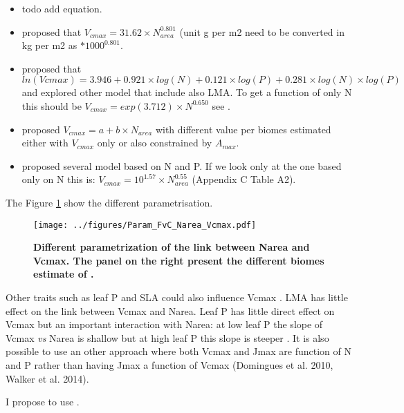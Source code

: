 \documentclass[a4paper,11pt]{article}
\begin{document}
\begin{itemize}

\item \citet{Kattge-2009} todo add equation.

\item \citet{Sakschewski-2015} proposed that $V_{cmax} = 31.62 \times N_{area}^{0.801}$ (unit g per m2 need to be converted in kg per m2 as $*1000^{0.801}$.

\item  \citet{Walker-2014} proposed that $ln(Vcmax) = 3.946 + 0.921 \times log(N) + 0.121 \times log(P) + 0.281 \times log(N) \times log(P)$ and explored other model that include also LMA. To get a function of only N this should be $V_{cmax} = exp(3.712) \times N^{0.650}$ see  \citet{Walker-2017}.

\item \citet{Kattge-2011} proposed $V_{cmax} = a + b \times N_{area}$ with different value per biomes estimated either with $V_{cmax}$ only or also constrained by $A_{max}$.

\item \citet{Domingues-2010} proposed several model based on N and P.  If we look only at the one based only on N this is: $V_{cmax} = 10^{1.57} \times N_{area}^{0.55}$ (Appendix C Table A2).

\end{itemize}

The Figure \ref{fig:Narea_Vcmax} show the different parametrisation.

\begin{figure}[ht]
\centering
\texttt{[image: ../figures/Param\_FvC\_Narea\_Vcmax.pdf]}
\caption{\textbf{Different parametrization of the link between Narea and Vcmax. The panel on the right present the different biomes estimate of \citet{Kattge-2011}.}
\label{fig:Narea_Vcmax}}
\end{figure}

Other traits such as leaf P and SLA could also influence Vcmax \citep{Walker-2014,Domingues-2010}. LMA has little effect on the link between Vcmax and Narea.  Leaf P has little direct effect on Vcmax but an important interaction with Narea: at low leaf P the slope of Vcmax \textit{vs} Narea is shallow but at high leaf P this slope is steeper \citep{Walker-2014}.
It is also possible to use an other approach where both Vcmax and Jmax
are function of N and P rather than having Jmax a function of Vcmax (Domingues et al. 2010, Walker et al. 2014).

I propose to use \citet{Sakschewski-2015}.
\end{document}
